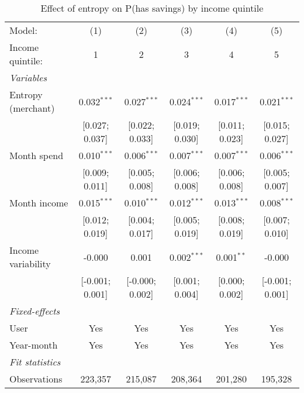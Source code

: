 
\begin{table}[htbp]
   \centering
   \tiny
   \begin{threeparttable}[b]
      \caption{\label{tab:reg_has_inflows_entropy_merchant_z_inc_quint} Effect of entropy on P(has savings) by income quintile}
      \begin{tabular}{lccccc}
         \tabularnewline \midrule \midrule
         Model:             & (1)             & (2)             & (3)            & (4)            & (5)\\  
         Income quintile:   & 1               & 2               & 3              & 4              & 5 \\   
         \midrule
         \emph{Variables}\\
         Entropy (merchant) & 0.032$^{***}$   & 0.027$^{***}$   & 0.024$^{***}$  & 0.017$^{***}$  & 0.021$^{***}$\\   
                            & [0.027; 0.037]  & [0.022; 0.033]  & [0.019; 0.030] & [0.011; 0.023] & [0.015; 0.027]\\   
         Month spend        & 0.010$^{***}$   & 0.006$^{***}$   & 0.007$^{***}$  & 0.007$^{***}$  & 0.006$^{***}$\\   
                            & [0.009; 0.011]  & [0.005; 0.008]  & [0.006; 0.008] & [0.006; 0.008] & [0.005; 0.007]\\   
         Month income       & 0.015$^{***}$   & 0.010$^{***}$   & 0.012$^{***}$  & 0.013$^{***}$  & 0.008$^{***}$\\   
                            & [0.012; 0.019]  & [0.004; 0.017]  & [0.005; 0.019] & [0.008; 0.019] & [0.007; 0.010]\\   
         Income variability & -0.000          & 0.001           & 0.002$^{***}$  & 0.001$^{**}$   & -0.000\\   
                            & [-0.001; 0.001] & [-0.000; 0.002] & [0.001; 0.004] & [0.000; 0.002] & [-0.001; 0.001]\\   
         \midrule
         \emph{Fixed-effects}\\
         User               & Yes             & Yes             & Yes            & Yes            & Yes\\  
         Year-month         & Yes             & Yes             & Yes            & Yes            & Yes\\  
         \midrule
         \emph{Fit statistics}\\
         Observations       & 223,357         & 215,087         & 208,364        & 201,280        & 195,328\\  

\end{tabular}
\end{threeparttable}
\end{table}
